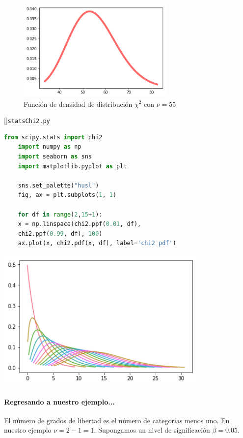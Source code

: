 \begin{figure}
	\centering
	\includegraphics[height=5cm,keepaspectratio=true]{./images/statsChi2.png}
	\caption{Función de densidad de distribución $\chi^2$ con $\nu=55$}
	\label{fig:Chi2}
\end{figure}


[]{\texttt{statsChi2.py}}
\begin{lstlisting}[language=Python]
	from scipy.stats import chi2
	import numpy as np
	import seaborn as sns
	import matplotlib.pyplot as plt
	
	sns.set_palette("husl")
	fig, ax = plt.subplots(1, 1)
	
	for df in range(2,15+1):
	x = np.linspace(chi2.ppf(0.01, df),
	chi2.ppf(0.99, df), 100)
	ax.plot(x, chi2.pdf(x, df), label='chi2 pdf')
\end{lstlisting}



\begin{center}
	\includegraphics[height=7cm,keepaspectratio=true]{./images/statsChi2Several.png}
\end{center}


\paragraph{Regresando a nuestro ejemplo...}
El número de grados de libertad es el número de categorías menos uno.  En nuestro ejemplo $\nu = 2-1 =1.$  Supongamos un nivel de significación $\beta=0.05.$


